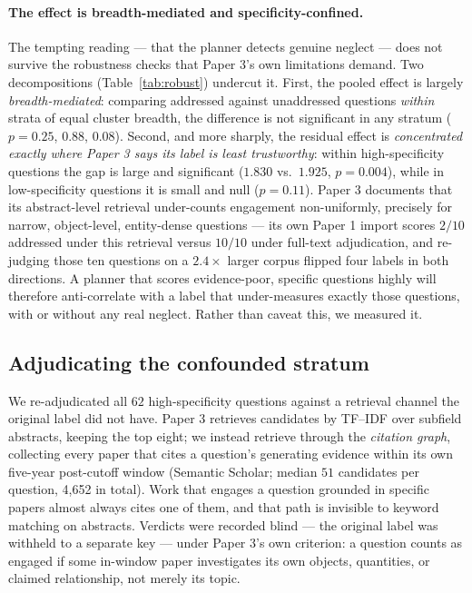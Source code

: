 \documentclass[11pt]{article}
\begin{document}
\paragraph{The effect is breadth-mediated and specificity-confined.}
The tempting reading --- that the planner detects genuine neglect ---
does not survive the robustness checks that Paper 3's own limitations
demand. Two decompositions (Table~\ref{tab:robust}) undercut it. First,
the pooled effect is largely \emph{breadth-mediated}: comparing
addressed against unaddressed questions \emph{within} strata of equal
cluster breadth, the difference is not significant in any stratum
($p = 0.25$, $0.88$, $0.08$). Second, and more sharply, the residual
effect is \emph{concentrated exactly where Paper 3 says its label is
least trustworthy}: within high-specificity questions the gap is large
and significant ($1.830$ vs.\ $1.925$, $p = 0.004$), while in
low-specificity questions it is small and null ($p = 0.11$). Paper 3
documents that its abstract-level retrieval under-counts engagement
non-uniformly, precisely for narrow, object-level, entity-dense
questions --- its own Paper 1 import scores $2/10$ addressed under this
retrieval versus $10/10$ under full-text adjudication, and re-judging
those ten questions on a $2.4\times$ larger corpus flipped four labels
in both directions. A planner that scores evidence-poor, specific
questions highly will therefore anti-correlate with a label that
under-measures exactly those questions, with or without any real
neglect. Rather than caveat this, we measured it.

\subsection{Adjudicating the confounded stratum}
\label{sec:adjudication}

We re-adjudicated all $62$ high-specificity questions against a
retrieval channel the original label did not have. Paper 3 retrieves
candidates by TF--IDF over subfield abstracts, keeping the top eight;
we instead retrieve through the \emph{citation graph}, collecting every
paper that cites a question's generating evidence within its own
five-year post-cutoff window (Semantic Scholar; median $51$ candidates
per question, 4{,}652 in total). Work that engages a question grounded in specific papers
almost always cites one of them, and that path is invisible to keyword
matching on abstracts. Verdicts were recorded blind --- the original
label was withheld to a separate key --- under Paper 3's own criterion:
a question counts as engaged if some in-window paper investigates its
own objects, quantities, or claimed relationship, not merely its topic.
\end{document}

